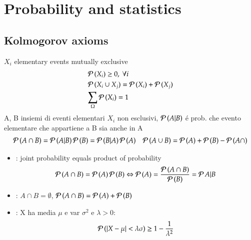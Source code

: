 \documentclass[main.tex]{subfiles}
\begin{document}
\chapter{Probability and statistics}

\section{Kolmogorov axioms}
$X_i$ elementary events mutually exclusive
\begin{align*}
&\prob{(X_i)}\geq0,\ \forall i\\
&\prob{(X_i\cup X_j)}=\prob{(X_i)}+\prob{(X_j)}\\
&\sum_{\Omega}\prob{(X_i)}=1
\end{align*}
A, B insiemi di eventi elementari $X_i$ non esclusivi, $\prob{(A|B)}$ \'e prob. che evento elementare che appartiene a B sia anche in A
\begin{align*}
&\prob{(A\cap B)}=\prob{(A|B)}\prob{(B)}=\prob{(B|A)}\prob{(A)}
&\prob{(A\cup B)}=\prob{(A)}+\prob{(B)}-\prob{(A\cap)} 
\end{align*}
\begin{itemize}
\item {}: joint probability equals product of probability
\[\prob{(A\cap B)}=\prob{(A)}\prob{(B)}\Leftrightarrow \prob{(A)}=\frac{\prob{(A\cap B)}}{\prob{(B)}}=\prob{A|B}\]
\item {}: $A\cap B=\emptyset$, $\prob{(A\cap B)}=\prob{(A)}+\prob{(B)}$
\item {}: X ha media $\mu$ e var $\sigma^2$ e $\lambda>0$:
\[\prob{(|X-\mu|<\lambda\sigma)}\geq1-\frac{1}{\lambda^2}\]

\end{itemize}
\end{document}
